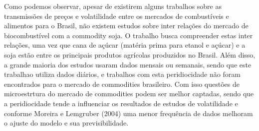 \documentclass[a4paper,12pt] {article}
\begin{document}
	Como podemos observar, apesar de existirem alguns trabalhos sobre as transmissões de preços e volatilidade entre os mercados de combustíveis e alimentos para o Brasil, não existem estudos sobre inter relações do mercado de biocombustível com a commodity soja. O trabalho busca compreender estas inter relações, uma vez que cana de açúcar (matéria prima para etanol e açúcar) e a soja estão entre os principais produtos agrícolas produzidos no Brasil. Além disso, a grande maioria dos estudos usaram dados mensais ou semanais, sendo que este trabalhao utiliza dados diários, e trabalhos com esta peridiocidade não foram encontrados para o mercado de commodities brasileiro. Com isso questões de microestrtura do mercado de commodities podem ser melhor captadas, sendo que a peridiocidade tende a influenciar os resultados de estudos de volatilidade e conforme Moreira e Lemgruber (2004) uma menor frequência de dados melhoram o ajuste do modelo e sua previsibilidade.
	
	
	

	
	
\end{document}
